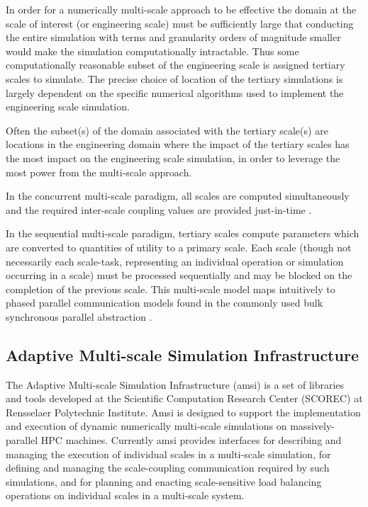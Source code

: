 \documentclass[11pt]{siamltex1213}
\begin{document}
In order for a numerically multi-scale approach to be effective the domain at the scale of interest (or engineering scale) must be sufficiently large that conducting the entire simulation with terms and granularity orders of magnitude smaller would make the simulation computationally intractable. Thus some computationally reasonable subset of the engineering scale is assigned tertiary scales to simulate. The precise choice of location of the tertiary simulations is largely dependent on the specific numerical algorithms used to implement the engineering scale simulation. 

Often the subset(s) of the domain associated with the tertiary scale(s) are locations in the engineering domain where the impact of the tertiary scales has the most impact on the engineering scale simulation, in order to leverage the most power from the multi-scale approach.

In the concurrent multi-scale paradigm, all scales are computed simultaneously and the required inter-scale coupling values are provided just-in-time \cite{zeng2010concurrent}.

In the sequential multi-scale paradigm, tertiary scales compute parameters which are converted to quantities of utility to a primary scale. Each scale (though not necessarily each scale-task, representing an individual operation or simulation occurring in a scale) must be processed sequentially \cite{garcia2008sequential} and may be blocked on the completion of the previous scale. This multi-scale model maps intuitively to phased parallel communication models found in the commonly used bulk synchronous parallel abstraction \cite{valiant1990bridging}. 

\subsection{Adaptive Multi-scale Simulation Infrastructure}\label{amsi}
The Adaptive Multi-scale Simulation Infrastructure (amsi) is a set of libraries and tools developed at the Scientific Computation Research Center (SCOREC) at Rensselaer Polytechnic Institute. Amsi is designed to support the implementation and execution of dynamic numerically multi-scale simulations on massively-parallel HPC machines. Currently amsi provides interfaces for describing and managing the execution of individual scales in a multi-scale simulation, for defining and managing the scale-coupling communication required by such simulations, and for planning and enacting scale-sensitive load balancing operations on individual scales in a multi-scale system. 
\end{document}
